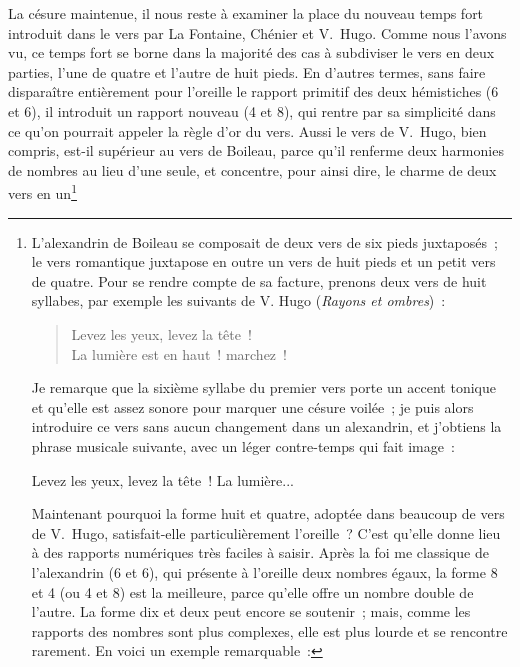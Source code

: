 \documentclass[french,twoside]{book} %
\begin{document}
 La césure maintenue, il nous reste à examiner la place du nouveau temps fort introduit dans le vers par La Fontaine, Chénier et V. Hugo. Comme nous l’avons vu, ce temps fort se borne dans la majorité des cas à subdiviser le vers en deux parties, l’une de quatre et l’autre de huit pieds. En d’autres termes, sans faire disparaître entièrement pour l’oreille le rapport primitif des deux hémistiches (6 et 6), il introduit un rapport nouveau (4 et 8), qui rentre par sa simplicité dans ce qu’on pourrait appeler la règle d’or du vers. Aussi le vers de V. Hugo, bien compris, est-il supérieur au vers de Boileau, parce qu’il renferme deux harmonies de nombres au lieu d’une seule, et concentre, pour ainsi dire, le charme de deux vers en un\footnote{\noindent L’alexandrin de Boileau se composait de deux vers de six pieds juxtaposés ; le vers romantique juxtapose en outre un vers de huit pieds et un petit vers de quatre. Pour se rendre compte de sa facture, prenons deux vers de huit syllabes, par exemple les suivants de V. Hugo (\emph{Rayons et ombres}) :\par

\begin{verse}
Levez les yeux, levez la tête !\\
La lumière est en haut ! marchez !\\
\end{verse}
\par
\noindent Je remarque que la sixième syllabe du premier vers porte un accent tonique et qu’elle est assez sonore pour marquer une césure voilée ; je puis alors introduire ce vers sans aucun changement dans un alexandrin, et j’obtiens la phrase musicale suivante, avec un léger contre-temps qui fait image :\par
Levez les yeux, levez la tête ! La lumière...\\
\par
\noindent Maintenant pourquoi la forme huit et quatre, adoptée dans beaucoup de vers de V. Hugo, satisfait-elle particulièrement l’oreille ? C’est qu’elle donne lieu à des rapports numériques très faciles à saisir. Après la foi me classique de l’alexandrin (6 et 6), qui présente à l’oreille deux nombres égaux, la forme 8 et 4 (ou 4 et 8) est la meilleure, parce qu’elle offre un nombre double de l’autre. La forme dix et deux peut encore se soutenir ; mais, comme les rapports des nombres sont plus complexes, elle est plus lourde et se rencontre rarement. En voici un exemple remarquable :\par

}
\end{document}
